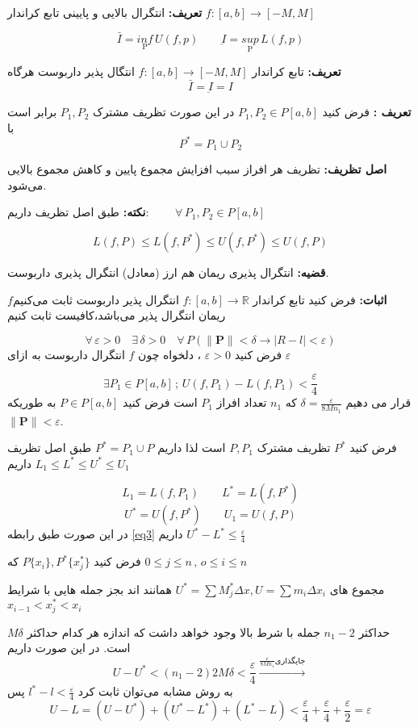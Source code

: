 \documentclass[12pt]{report}
\begin{document}
\textbf{تعریف:}
انتگرال بالایی و پایینی تابع کراندار
$f:[a, b] \rightarrow [-M, M]$

\[
\bar{I}= \underset{\text{P}}{inf}\, U(f, p) \qquad \underbar{I} = \underset{\text{P}}{sup}\, L(f, p)
\]

\textbf{تعریف:}
تابع کراندار 
$f:[a, b] \rightarrow [-M, M]$
انتگال پذیر داربوست هرگاه
\[
\bar{I}=\underbar{I} = I
\]

\textbf{ تعریف :}
فرض کنید 
$P_1, P_2 \in P[a, b]$ 
در این صورت تظریف مشترک 
$P_1, P_2$
برابر است با
\[
P^* = P_1 \cup P_2
\]

\textbf{اصل تظریف:}	
تظریف هر افراز سبب افزایش مجموع پایین و کاهش مجموع بالایی می‌شود.

\textbf{نکته:}
طبق اصل تظریف داریم:
$\qquad \forall\,P_1, P_2 \in P[a, b]$

\[
L(f, P) \leq L(f, P^*)\leq U(f, P^*) \leq U(f, P)
\] 

\textbf{قضیه:}
انتگرال پذیری ریمان هم ارز (معادل) انتگرال پذیری داربوست.

\textbf{اثبات: }
فرض کنید تابع کراندار 
$f:[a, b] \rightarrow \mathbb{R}$
انتگرال پذیر داربوست ثابت می‌کنیم$ f$ ریمان انتگرال پذیر می‌باشد،کافیست ثابت کنیم

\[
\forall \,\varepsilon > 0 \quad \exists\,\delta > 0 \quad \forall\,P(\lVert \mathbf{P} \rVert < \delta \rightarrow |R - l| < \varepsilon)
\]
فرض کنید
$\varepsilon > 0$
، دلخواه چون
$f$
انتگرال داربوست به ازای 
$\varepsilon$


\begin{equation}\label{eq3}
	\exists P_1 \in P[a, b]\,;\, U(f, P_1) - L(f, P_1) < \frac{\varepsilon}{4}
\end{equation}
قرار می دهیم 
$\delta = \frac{\varepsilon}{8Mn_1}$
که
$n_1$
تعداد افراز 
$P_1$
است
فرض کنید 
$P \in P[a,b]$
به طوریکه
$\lVert \mathbf{P} \rVert < \varepsilon$.

فرض کنید 
$P^*$
تظریف مشترک 
$P , P_1$
است لذا داریم
$P^* = P_1 \cup P$
طبق اصل تظریف داریم
$L_1 \leq L^* \leq U^* \leq U_1$

\[
L_1 = L(f, P_1) \qquad L^* = L(f, P^*)
\]
\[
U^* = U(f, P^*) \qquad U_1= U(f, P)
\]
در این صورت طبق رابطه
\ref{eq3}
داریم
$U^* - L^* \leq \frac{\varepsilon}{4}$

فرض کنید
$P\{x_i\}, P^*\{x^*_j\}$
که 
$0 \leq j \leq n\, , \, o \leq i \leq n$

مجموع های
$U^* = \sum M^*_j \Delta x , U = \sum m_i \Delta x_i$ 
همانند اند بجز جمله هایی با شرایط
$x_{i - 1} < x^*_j < x_i$

حداکثر 
$n_1 - 2$
جمله با شرط بالا وجود خواهد داشت که اندازه هر کدام حداکثر
$M\delta$
است. در این صورت داریم
\begin{equation}\label{eq4}
	U- U^* < (n_1 - 2)2M\delta < \frac{\varepsilon}{4} \xrightarrow{\frac{\varepsilon}{8Mn_1}\text{جایگذاری}}
\end{equation} 
به روش مشابه می‌توان ثابت کرد
$l^* - l < \frac{\varepsilon}{4}$
پس
\[
U - L = (U - U^*) + (U^* - L^*) + (L^*  - L) < \frac{\varepsilon}{4} + \frac{\varepsilon}{4} + \frac{\varepsilon}{2}= \varepsilon
\]	
\end{document}
